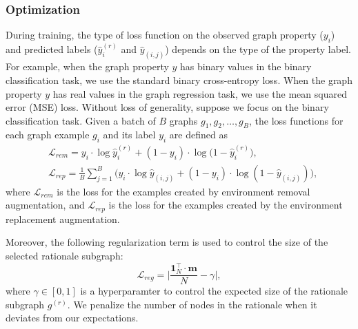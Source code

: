 \documentclass[sigconf]{acmart}
\begin{document}
\subsubsection{Optimization}
\label{sec:training}
During training, the type of loss function on the observed graph property ($y_i$) and predicted labels ($\hat{y}_{i}^{(r)}$ and $\hat{y}_{(i,j)}$) depends on the type of the property label. For example, when the graph property $y$ has binary values in the binary classification task, we use the standard binary cross-entropy loss. When the graph property $y$ has real values in the graph regression task, we use the mean squared error (MSE) loss. Without loss of generality, suppose we focus on the binary classification task. Given a batch of $B$ graphs $g_1, g_2, \dots, g_B$, the loss functions for each graph example $g_i$ and its label $y_i$ are defined as
\begin{align}
    \label{eq:loss_rem}
    &\mathcal{L}_{rem} = y_{i} \cdot \log \hat{y}_{i}^{(r)} + \left(1-y_{i}\right) \cdot \log \big(1-\hat{y}_{i}^{(r)}\big), \\
    \label{eq:loss_rep}
    &\mathcal{L}_{rep} = \frac{1}{B} \sum_{j=1}^B \big( y_{i} \cdot \log \hat{y}_{(i,j)} + \left(1-y_{i}\right) \cdot \log (1-\hat{y}_{(i,j)}) \big),
\end{align}
where $\mathcal{L}_{rem}$ is the loss for the examples created by environment removal augmentation, and $\mathcal{L}_{rep}$ is the loss for the examples created by the environment replacement augmentation. 

Moreover, the following regularization term is used to control the size of the selected rationale subgraph:
\begin{equation}
\label{eq:loss_reg}
    \mathcal{L}_{reg} = \Big|\frac{\mathbf{1}^\top_N \cdot \mathbf{m}}{N} - \gamma \Big|,
\end{equation}
where $\gamma \in [0,1]$ is a hyperparamter to control the expected size of the rationale subgraph $g^{(r)}$. We penalize the number of nodes in the rationale when it deviates from our expectations.
\end{document}
